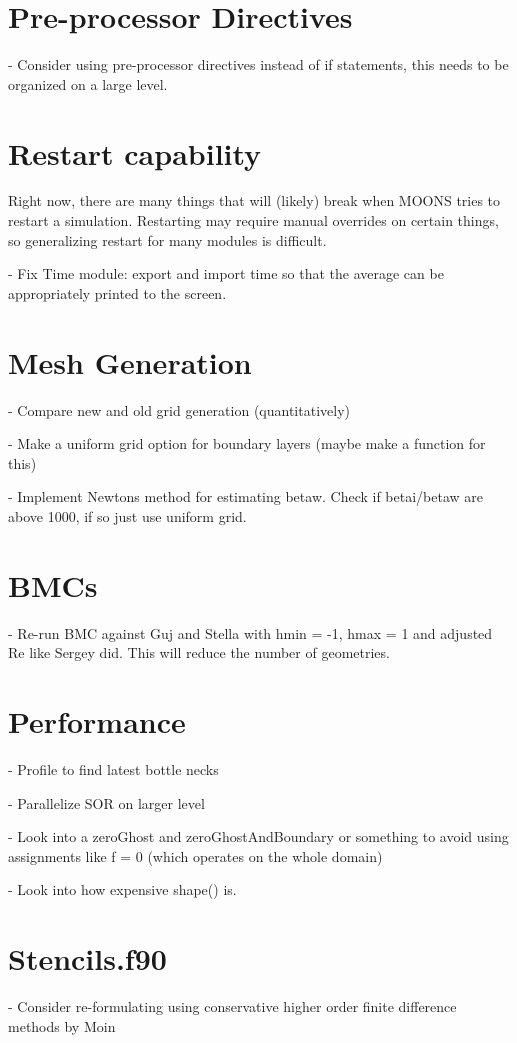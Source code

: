 \documentclass[11pt]{article}
\begin{document}
\section{Pre-processor Directives}
- Consider using pre-processor directives instead of if statements, this needs to be organized on a large level.

\section{Restart capability}
Right now, there are many things that will (likely) break when MOONS tries to restart a simulation. Restarting may require manual overrides on certain things, so generalizing restart for many modules is difficult.

- Fix Time module: export and import time so that the average can be appropriately
printed to the screen.



\section{Mesh Generation}

- Compare new and old grid generation (quantitatively)

- Make a uniform grid option for boundary layers (maybe make a function for this)

- Implement Newtons method for estimating betaw. Check if betai/betaw
are above 1000, if so just use uniform grid.


\section{BMCs}

- Re-run BMC against Guj and Stella with hmin = -1, hmax = 1 and adjusted Re like Sergey
  did. This will reduce the number of geometries.

\section{Performance}
- Profile to find latest bottle necks

- Parallelize SOR on larger level

- Look into a zeroGhost and zeroGhostAndBoundary or something to avoid using assignments like f = 0 (which operates on the whole domain)

- Look into how expensive shape() is.


\section{Stencils.f90}
- Consider re-formulating using conservative higher order finite difference methods by Moin
\end{document}
